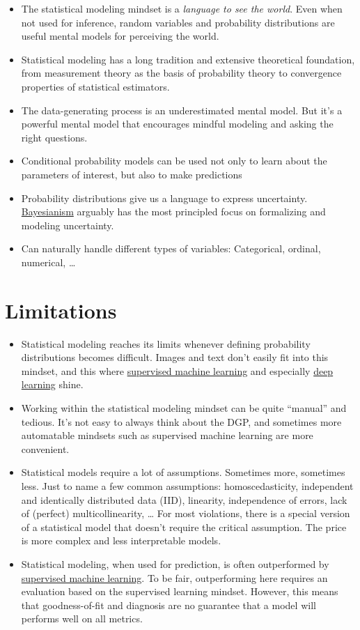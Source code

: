 \documentclass[
  10pt,
]{scrbook}
\providecommand{\tightlist}{%
  \setlength{\itemsep}{0pt}\setlength{\parskip}{0pt}}
\begin{document}
\begin{itemize}
\tightlist
\item
  The statistical modeling mindset is a \emph{language to see the world}. Even when not used for inference, random variables and probability distributions are useful mental models for perceiving the world.
\item
  Statistical modeling has a long tradition and extensive theoretical foundation, from measurement theory as the basis of probability theory to convergence properties of statistical estimators.
\item
  The data-generating process is an underestimated mental model. But it's a powerful mental model that encourages mindful modeling and asking the right questions.
\item
  Conditional probability models can be used not only to learn about the parameters of interest, but also to make predictions
\item
  Probability distributions give us a language to express uncertainty. \protect\hyperlink{bayesian-inference}{Bayesianism} arguably has the most principled focus on formalizing and modeling uncertainty.
\item
  Can naturally handle different types of variables: Categorical, ordinal, numerical, \ldots{}
\end{itemize}

\hypertarget{limitations}{%
\section{Limitations}\label{limitations}}

\begin{itemize}
\tightlist
\item
  Statistical modeling reaches its limits whenever defining probability distributions becomes difficult. Images and text don't easily fit into this mindset, and this where \protect\hyperlink{supervised-ml}{supervised machine learning} and especially \protect\hyperlink{deep-learning}{deep learning} shine.
\item
  Working within the statistical modeling mindset can be quite ``manual'' and tedious. It's not easy to always think about the DGP, and sometimes more automatable mindsets such as supervised machine learning are more convenient.
\item
  Statistical models require a lot of assumptions. Sometimes more, sometimes less. Just to name a few common assumptions: homoscedasticity, independent and identically distributed data (IID), linearity, independence of errors, lack of (perfect) multicollinearity, \ldots{} For most violations, there is a special version of a statistical model that doesn't require the critical assumption. The price is more complex and less interpretable models.
\item
  Statistical modeling, when used for prediction, is often outperformed by \protect\hyperlink{supervised-ml}{supervised machine learning}. To be fair, outperforming here requires an evaluation based on the supervised learning mindset. However, this means that goodness-of-fit and diagnosis are no guarantee that a model will performs well on all metrics.
\end{itemize}
\end{document}

